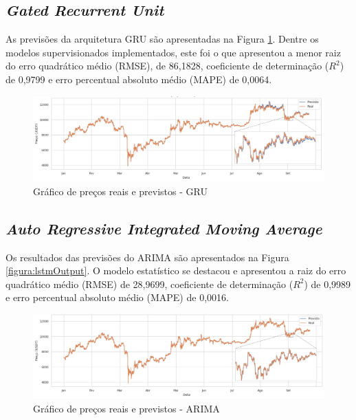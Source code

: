 \subsection{\textit{Gated Recurrent Unit}}

As previsões da arquitetura GRU são apresentadas na Figura \ref{figura:gruOutput}. Dentre os modelos supervisionados implementados, este foi o que apresentou a menor raiz do erro quadrático médio (RMSE), de 86,1828, coeficiente de determinação ($R^2$) de 0,9799 e erro percentual absoluto médio (MAPE) de 0,0064.

\begin{figure}[!htb] \centering
  \caption{Gráfico de preços reais e previstos - GRU} \label{figura:gruOutput}
  \begin{varwidth}{\linewidth}
    \includegraphics[width=16cm]{figuras/gruOutput.png}
  \end{varwidth}
\end{figure}

\subsection{\textit{Auto Regressive Integrated Moving Average}}

Os resultados das previsões do ARIMA são apresentados na Figura \ref{figura:lstmOutput}. O modelo estatístico se destacou e apresentou a raiz do erro quadrático médio (RMSE) de 28,9699, coeficiente de determinação ($R^2$) de 0,9989 e erro percentual absoluto médio (MAPE) de 0,0016.

\begin{figure}[!htb] \centering
  \caption{Gráfico de preços reais e previstos - ARIMA} \label{figura:arimaOutput}
  \begin{varwidth}{\linewidth}
    \includegraphics[width=16cm]{figuras/arimaOutput.png}
  \end{varwidth}
\end{figure}


